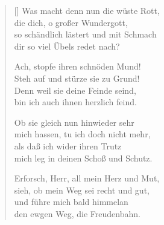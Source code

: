 \begin{multicols}{2}
\begin{verse}[\versewidth]
 Was macht denn nun die wüste Rott,\\
die dich, o großer Wundergott,\\
so schändlich lästert und mit Schmach\\
dir so viel Übels redet nach?

 Ach, stopfe ihren schnöden Mund!\\
Steh auf und stürze sie zu Grund!\\
Denn weil sie deine Feinde seind,\\
bin ich auch ihnen herzlich feind.

 Ob sie gleich nun hinwieder sehr\\
mich hassen, tu ich doch nicht mehr,\\
als daß ich wider ihren Trutz\\
mich leg in deinen Schoß und Schutz.

 Erforsch, Herr, all mein Herz und Mut,\\
sieh, ob mein Weg sei recht und gut,\\
und führe mich bald himmelan\\
den ewgen Weg, die Freudenbahn.

\end{verse}
\end{multicols}
